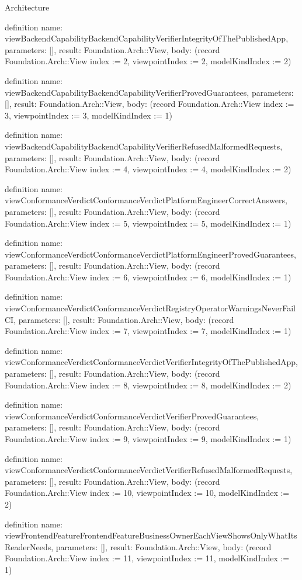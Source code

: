 \begin{lexlean}{Architecture}
\begin{semanticmodule}
definition{
  name: viewBackendCapabilityBackendCapabilityVerifierIntegrityOfThePublishedApp,
  parameters: [],
  result: Foundation.Arch::View,
  body: (record Foundation.Arch::View {index := 2, viewpointIndex := 2, modelKindIndex := 2})
}

definition{
  name: viewBackendCapabilityBackendCapabilityVerifierProvedGuarantees,
  parameters: [],
  result: Foundation.Arch::View,
  body: (record Foundation.Arch::View {index := 3, viewpointIndex := 3, modelKindIndex := 1})
}

definition{
  name: viewBackendCapabilityBackendCapabilityVerifierRefusedMalformedRequests,
  parameters: [],
  result: Foundation.Arch::View,
  body: (record Foundation.Arch::View {index := 4, viewpointIndex := 4, modelKindIndex := 2})
}

definition{
  name: viewConformanceVerdictConformanceVerdictPlatformEngineerCorrectAnswers,
  parameters: [],
  result: Foundation.Arch::View,
  body: (record Foundation.Arch::View {index := 5, viewpointIndex := 5, modelKindIndex := 1})
}

definition{
  name: viewConformanceVerdictConformanceVerdictPlatformEngineerProvedGuarantees,
  parameters: [],
  result: Foundation.Arch::View,
  body: (record Foundation.Arch::View {index := 6, viewpointIndex := 6, modelKindIndex := 1})
}

definition{
  name: viewConformanceVerdictConformanceVerdictRegistryOperatorWarningsNeverFailCI,
  parameters: [],
  result: Foundation.Arch::View,
  body: (record Foundation.Arch::View {index := 7, viewpointIndex := 7, modelKindIndex := 1})
}

definition{
  name: viewConformanceVerdictConformanceVerdictVerifierIntegrityOfThePublishedApp,
  parameters: [],
  result: Foundation.Arch::View,
  body: (record Foundation.Arch::View {index := 8, viewpointIndex := 8, modelKindIndex := 2})
}

definition{
  name: viewConformanceVerdictConformanceVerdictVerifierProvedGuarantees,
  parameters: [],
  result: Foundation.Arch::View,
  body: (record Foundation.Arch::View {index := 9, viewpointIndex := 9, modelKindIndex := 1})
}

definition{
  name: viewConformanceVerdictConformanceVerdictVerifierRefusedMalformedRequests,
  parameters: [],
  result: Foundation.Arch::View,
  body: (record Foundation.Arch::View {index := 10, viewpointIndex := 10, modelKindIndex := 2})
}

definition{
  name: viewFrontendFeatureFrontendFeatureBusinessOwnerEachViewShowsOnlyWhatItsReaderNeeds,
  parameters: [],
  result: Foundation.Arch::View,
  body: (record Foundation.Arch::View {index := 11, viewpointIndex := 11, modelKindIndex := 1})
}


\end{semanticmodule}
\end{lexlean}
